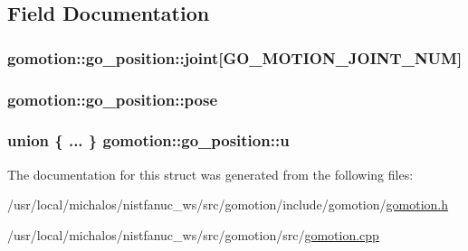 \subsection{Field Documentation}
\hypertarget{structgomotion_1_1go__position_abe054c50898120fd6b1b260edf8f0074}{
\subsubsection[{joint}]{ gomotion\-::go\-\_\-position\-::joint\mbox{[}{\bf G\-O\-\_\-\-M\-O\-T\-I\-O\-N\-\_\-\-J\-O\-I\-N\-T\-\_\-\-N\-U\-M}\mbox{]}}}\label{structgomotion_1_1go__position_abe054c50898120fd6b1b260edf8f0074}
\hypertarget{structgomotion_1_1go__position_a52e09e22901615c1ca71757ea57215ca}{
\subsubsection[{pose}]{ gomotion\-::go\-\_\-position\-::pose}}\label{structgomotion_1_1go__position_a52e09e22901615c1ca71757ea57215ca}
\hypertarget{structgomotion_1_1go__position_a9c36a514458a3a87eb49cbf1df68ed21}{
\subsubsection[{u}]{\setlength{\rightskip}{0pt plus 5cm}union \{ ... \}   gomotion\-::go\-\_\-position\-::u}}\label{structgomotion_1_1go__position_a9c36a514458a3a87eb49cbf1df68ed21}


The documentation for this struct was generated from the following files\-:\begin{DoxyCompactItemize}
\item 
/usr/local/michalos/nistfanuc\-\_\-ws/src/gomotion/include/gomotion/\hyperlink{gomotion_8h}{gomotion.\-h}\item 
/usr/local/michalos/nistfanuc\-\_\-ws/src/gomotion/src/\hyperlink{gomotion_8cpp}{gomotion.\-cpp}\end{DoxyCompactItemize}
